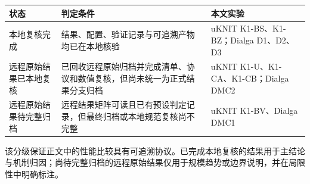 \documentclass{templates/cjc-utf8}
\def\endhead{}
\begin{document}
\begin{longtable}[]{@{}lll@{}}
\toprule
\begin{minipage}[b]{0.30\columnwidth}\raggedright
状态\strut
\end{minipage} & \begin{minipage}[b]{0.30\columnwidth}\raggedright
判定条件\strut
\end{minipage} & \begin{minipage}[b]{0.30\columnwidth}\raggedright
本文实验\strut
\end{minipage}\tabularnewline
\midrule
\endhead
\begin{minipage}[t]{0.30\columnwidth}\raggedright
本地复核完成\strut
\end{minipage} & \begin{minipage}[t]{0.30\columnwidth}\raggedright
结果、配置、验证记录与可追溯产物均已在本地核验\strut
\end{minipage} & \begin{minipage}[t]{0.30\columnwidth}\raggedright
uKNIT K1-BS、K1-BZ；Dialga D1、D2、D3\strut
\end{minipage}\tabularnewline
\begin{minipage}[t]{0.30\columnwidth}\raggedright
远程原始结果已本地复核\strut
\end{minipage} & \begin{minipage}[t]{0.30\columnwidth}\raggedright
已回收远程原始归档并完成清单、协议和数值复核，但尚未统一为正式结果分支归档\strut
\end{minipage} & \begin{minipage}[t]{0.30\columnwidth}\raggedright
uKNIT K1-U、K1-CA、K1-CB；Dialga DMC2\strut
\end{minipage}\tabularnewline
\begin{minipage}[t]{0.30\columnwidth}\raggedright
远程原始结果待完整归档\strut
\end{minipage} & \begin{minipage}[t]{0.30\columnwidth}\raggedright
远程结果矩阵可读且已有预设判定记录，但最终归档或本地规范复核尚不完整\strut
\end{minipage} & \begin{minipage}[t]{0.30\columnwidth}\raggedright
uKNIT K1-BV、Dialga DMC1\strut
\end{minipage}\tabularnewline
\bottomrule
\end{longtable}

该分级保证正文中的性能比较具有可追溯协议。已完成本地复核的结果用于主结论与机制归因；尚待完整归档的远程原始结果仅用于规模趋势或边界说明，并在局限性中明确标注。
\end{document}
